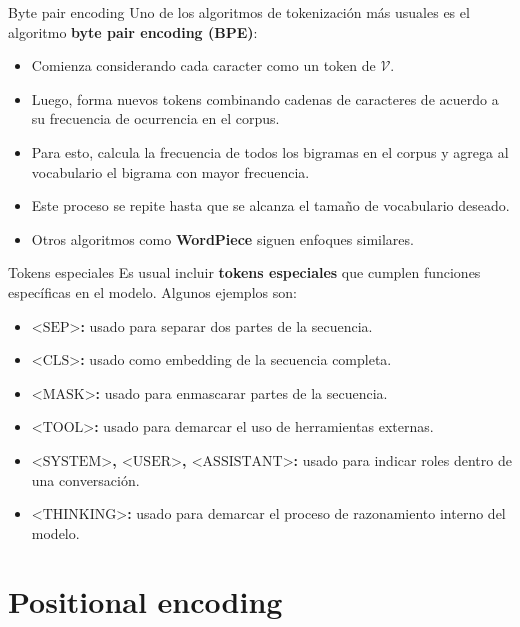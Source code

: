 \documentclass{beamer}
\begin{document}
\begin{frame}{Byte pair encoding}
    Uno de los algoritmos de tokenización más usuales es el algoritmo \textbf{byte pair encoding (BPE)}:
    \begin{itemize}
        \item Comienza considerando cada caracter como un token de $\mathcal{V}$.
        \item Luego, forma nuevos tokens combinando cadenas de caracteres de acuerdo a su frecuencia de ocurrencia en el corpus.
        \item Para esto, calcula la frecuencia de todos los bigramas en el corpus y agrega al vocabulario el bigrama con mayor frecuencia.
        \item Este proceso se repite hasta que se alcanza el tamaño de vocabulario deseado.
        \item Otros algoritmos como \textbf{WordPiece} siguen enfoques similares.
    \end{itemize}
\end{frame}

\begin{frame}{Tokens especiales}
    Es usual incluir \textbf{tokens especiales} que cumplen funciones específicas en el modelo. Algunos ejemplos son:
    \begin{itemize}
        \item \textbf{$\text{<SEP>}$:} usado para separar dos partes de la secuencia.
        \item \textbf{$\text{<CLS>}$:} usado como embedding de la secuencia completa.
        \item \textbf{$\text{<MASK>}$:} usado para enmascarar partes de la secuencia.
        \item \textbf{$\text{<TOOL>}$:} usado para demarcar el uso de herramientas externas.
        \item \textbf{$\text{<SYSTEM>}$, $\text{<USER>}$, $\text{<ASSISTANT>}$:} usado para indicar roles dentro de una conversación.
        \item \textbf{$\text{<THINKING>}$:} usado para demarcar el proceso de razonamiento interno del modelo.
    \end{itemize}
\end{frame}

\section{Positional encoding}
\end{document}
